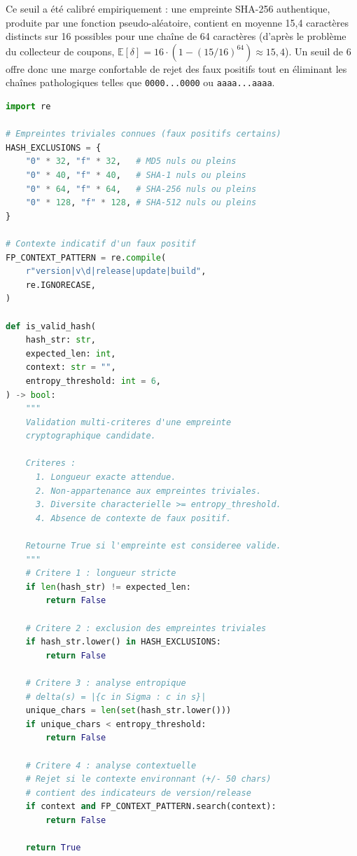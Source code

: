 Ce seuil a été calibré empiriquement : une empreinte SHA-256 authentique, produite par une fonction pseudo-aléatoire, contient en moyenne 15{,}4 caractères distincts sur 16 possibles pour une chaîne de 64 caractères (d'après le problème du collecteur de coupons, $\mathbb{E}[\delta] = 16 \cdot (1 - (15/16)^{64}) \approx 15{,}4$). Un seuil de 6 offre donc une marge confortable de rejet des faux positifs tout en éliminant les chaînes pathologiques telles que \texttt{0000...0000} ou \texttt{aaaa...aaaa}.

\begin{lstlisting}[language=Python, caption={Validation d'empreinte cryptographique par analyse entropique et exclusion contextuelle.}, label={lst:entropy}]
import re

# Empreintes triviales connues (faux positifs certains)
HASH_EXCLUSIONS = {
    "0" * 32, "f" * 32,   # MD5 nuls ou pleins
    "0" * 40, "f" * 40,   # SHA-1 nuls ou pleins
    "0" * 64, "f" * 64,   # SHA-256 nuls ou pleins
    "0" * 128, "f" * 128, # SHA-512 nuls ou pleins
}

# Contexte indicatif d'un faux positif
FP_CONTEXT_PATTERN = re.compile(
    r"version|v\d|release|update|build",
    re.IGNORECASE,
)

def is_valid_hash(
    hash_str: str,
    expected_len: int,
    context: str = "",
    entropy_threshold: int = 6,
) -> bool:
    """
    Validation multi-criteres d'une empreinte
    cryptographique candidate.

    Criteres :
      1. Longueur exacte attendue.
      2. Non-appartenance aux empreintes triviales.
      3. Diversite characterielle >= entropy_threshold.
      4. Absence de contexte de faux positif.

    Retourne True si l'empreinte est consideree valide.
    """
    # Critere 1 : longueur stricte
    if len(hash_str) != expected_len:
        return False

    # Critere 2 : exclusion des empreintes triviales
    if hash_str.lower() in HASH_EXCLUSIONS:
        return False

    # Critere 3 : analyse entropique
    # delta(s) = |{c in Sigma : c in s}|
    unique_chars = len(set(hash_str.lower()))
    if unique_chars < entropy_threshold:
        return False

    # Critere 4 : analyse contextuelle
    # Rejet si le contexte environnant (+/- 50 chars)
    # contient des indicateurs de version/release
    if context and FP_CONTEXT_PATTERN.search(context):
        return False

    return True
\end{lstlisting}

